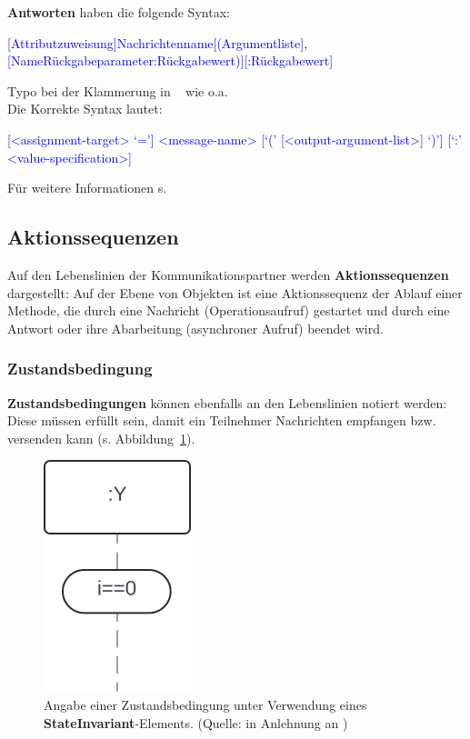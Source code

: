 \noindent
\textbf{Antworten} haben die folgende Syntax:

\medskip
\noindent
\begin{small}
    \textcolor{blue}{[Attributzuweisung]Nachrichtenname[(Argumentliste], [NameRückgabeparameter:Rückgabewert)][:Rückgabewert]}
\end{small}
\noindent

\begin{tcolorbox}[title=Syntax Antworten,colback=red!20]
    Typo bei der Klammerung in ~\cite[32]{Buh09} wie o.a.\\
    Die Korrekte Syntax lautet:

    \begin{small}
        \textcolor{blue}{
            [<assignment-target> ‘=’] <message-name>
            [‘(’ [<output-argument-list>] ‘)’] [‘:’ <value-specification>]
        }
    \end{small}
    Für weitere Informationen s. \cite[577 f.]{OMG17}

\end{tcolorbox}


\subsection*{Aktionssequenzen}
Auf den Lebenslinien der Kommunikationspartner werden \textbf{Aktionssequenzen} dargestellt: Auf der Ebene von Objekten ist eine Aktionssequenz der Ablauf einer Methode, die durch eine Nachricht (Operationsaufruf) gestartet und durch eine Antwort oder ihre Abarbeitung (asynchroner Aufruf) beendet wird.

\subsubsection*{Zustandsbedingung}
\textbf{Zustandsbedingungen} können ebenfalls an den Lebenslinien notiert werden: Diese müssen erfüllt sein, damit ein Teilnehmer Nachrichten empfangen bzw. versenden kann (s. Abbildung~\ref{fig:stateinvariant}).

\begin{figure}
    \centering
    \includegraphics[scale=0.5]{part three/Sequenzdiagramme/img/stateinvariant}
    \caption{Angabe einer Zustandsbedingung unter Verwendung eines \textbf{StateInvariant}-Elements. (Quelle: in Anlehnung an \cite[597]{OMG17})}
    \label{fig:stateinvariant}
\end{figure}

